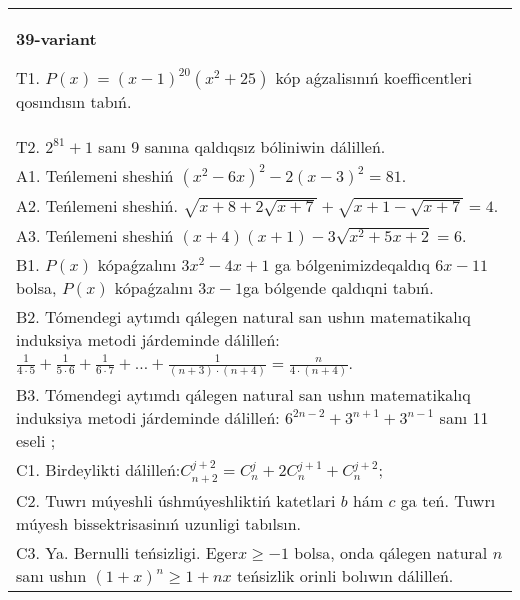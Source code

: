 \documentclass{article}
\begin{document}
\begin{tabular}{m{17cm}}
\textbf{39-variant}
\newline

T1. \(P(x) = (x - 1)^{20}\left( x^{2} + 25 \right)\) kóp aǵzalisınıń koefficentleri qosındısın tabıń. \\
T2. \(2^{81} + 1\) sanı 9 sanına qaldıqsız bóliniwin dálilleń. \\
A1. Teńlemeni sheshiń \(\left( x^{2} - 6x \right)^{2} - 2(x - 3)^{2} = 81\). \\
A2. Teńlemeni sheshiń. \(\sqrt{x + 8 + 2\sqrt{x + 7}} + \sqrt{x + 1 - \sqrt{x + 7}} = 4\). \\
A3. Teńlemeni sheshiń \((x + 4)(x + 1) - 3\sqrt{x^{2} + 5x + 2} = 6\). \\
B1. \(P(x)\) kópaǵzalını \(3x^{2} - 4x + 1\) ga bólgenimizdeqaldıq \(6x - 11\) bolsa, \(P(x)\) kópaǵzalını \(3x - 1\)ga bólgende qaldıqni tabıń. \\
B2. Tómendegi aytımdı qálegen natural san ushın matematikalıq induksiya metodi járdeminde dálilleń: \(\frac{1}{4 \cdot 5} + \frac{1}{5 \cdot 6} + \frac{1}{6 \cdot 7} + \ldots + \frac{1}{(n + 3) \cdot (n + 4)} = \frac{n}{4 \cdot (n + 4)}\). \\
B3. Tómendegi aytımdı qálegen natural san ushın matematikalıq induksiya metodi járdeminde dálilleń: \(6^{2n - 2} + 3^{n + 1} + 3^{n - 1}\) sanı 11 eseli ; \\
C1. Birdeylikti dálilleń:\(C_{n + 2}^{j + 2} = C_{n}^{j} + 2C_{n}^{j + 1} + C_{n}^{j + 2}\); \\
C2. Tuwrı múyeshli úshmúyeshliktiń katetlari \(b\) hám \(c\) ga teń. Tuwrı múyesh bissektrisasinıń uzunligi tabılsın. \\
C3. Ya. Bernulli teńsizligi. Eger\(x \geq - 1\) bolsa, onda qálegen natural \(n\) sanı ushın \((1 + x)^{n} \geq 1 + nx\) teńsizlik orinli bolıwın dálilleń. \\

\end{tabular}
\vspace{1cm}
\end{document}
